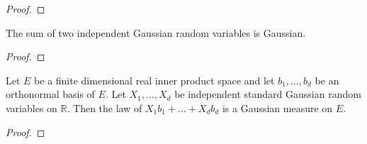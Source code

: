 \begin{proof}

\end{proof}


\begin{lemma}\label{lem:isGaussian_add}
The sum of two independent Gaussian random variables is Gaussian.
\end{lemma}

\begin{proof}

\end{proof}


\begin{lemma}\label{lem:stdGaussian_finiteDimensional}
Let $E$ be a finite dimensional real inner product space and let $b_1, \ldots, b_d$ be an orthonormal basis of $E$.
Let $X_1, \ldots, X_d$ be independent standard Gaussian random variables on $\mathbb{R}$.
Then the law of $X_1 b_1 + \ldots + X_d b_d$ is a Gaussian measure on $E$.
\end{lemma}

\begin{proof}

\end{proof}